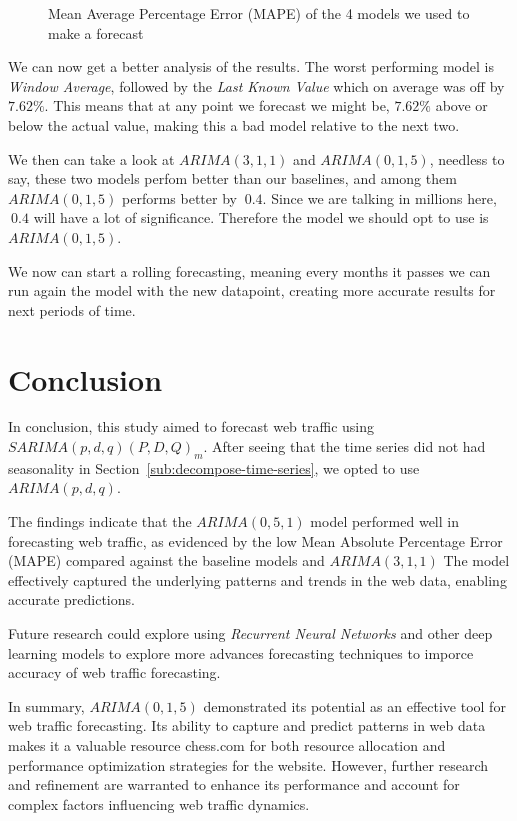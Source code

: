 \documentclass[journal]{IEEEtran}
\begin{document}
\begin{figure}[htbp]
  \centering
  
    \caption{Mean Average Percentage Error (MAPE) of the 4 models we used to
    make  a forecast} 
    \label{fig:mape}
\end{figure}

We can now get a better analysis of the results. The worst performing model is
\emph{Window Average}, followed by the \emph{Last Known Value} which on
average was off by $7.62\%$. This means that at any point we forecast we might
be, $7.62\%$ above or below the actual value, making this a bad model relative
to the next two.

We then can take a look at $ARIMA(3,1,1)$ and $ARIMA(0,1,5)$, needless to say,
these two models perfom better than our baselines, and among them
$ARIMA(0,1,5)$ performs better by $~0.4$. Since we are talking in millions
here, $~0.4$ will have a lot of significance. Therefore the model we should
opt to use is $ARIMA(0,1,5)$.

We now can start a rolling forecasting, meaning every months it passes we can
run again the model with the new datapoint,  creating more accurate results
for next periods of time.

\section{Conclusion}\label{sec:conclusion}

In conclusion, this study aimed to forecast web traffic using
$SARIMA(p,d,q)(P,D,Q)_m$. After seeing that the time series did not had
seasonality in Section~\ref{sub:decompose-time-series}, we opted to use
$ARIMA(p,d,q)$.

The findings indicate that the $ARIMA(0,5,1)$ model performed well in
forecasting web traffic, as evidenced by the low Mean Absolute Percentage
Error (MAPE) compared against the baseline models and $ARIMA(3,1,1)$  The
model effectively captured the underlying patterns and trends in the web data,
enabling accurate predictions.

Future research could explore using \emph{Recurrent Neural Networks} and other
deep learning models to explore more advances forecasting techniques to
imporce accuracy of web traffic forecasting. 

In summary, $ARIMA(0,1,5)$ demonstrated its potential as an effective tool for
web traffic forecasting. Its ability to capture and predict patterns in web
data makes it a valuable resource chess.com for both resource allocation and
performance optimization strategies for the website. However, further research
and refinement are warranted to enhance its performance and account for
complex factors influencing web traffic dynamics.
\end{document}
